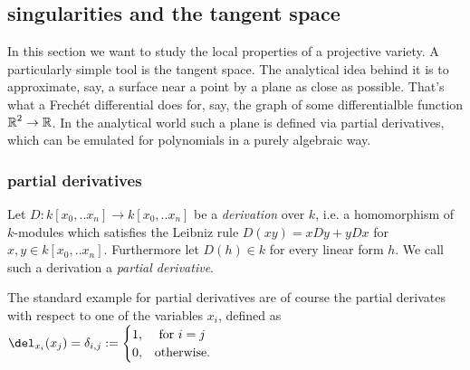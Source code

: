 \subsection{singularities and the tangent space}

In this section we want to study the local properties of a projective variety.
A particularly simple tool is the tangent space.
The analytical idea behind it is to approximate, say, a surface near a point by a plane as close as possible.
That's what a Frechét differential does for, say,  the graph of some differentialble function $\operatorname{\mathbb R}^2 \to \operatorname{\mathbb R}$.
In the analytical world such a plane is defined via partial derivatives, which can be emulated for polynomials in a purely algebraic way.

\subsubsection{partial derivatives}
\begin{definition}
Let $D : k[x_0,..x_n] \to k[x_0,..x_n]$ be a \emph{derivation} over $k$, i.e. a homomorphism of $k$-modules which satisfies the Leibniz rule $D(xy) = xDy+yDx$ for $x,y \in k[x_0,..x_n]$. Furthermore let $D(h) \in k$ for every linear form $h$. We call such a derivation a \emph{partial derivative}.
\end{definition}

\begin{example}
The standard example for partial derivatives are of course the partial derivates with respect to one of the variables $x_i$, defined as $\del_{x_i}(x_j) = \delta_{i,j} := \begin{cases} 1, & \text{ for } i = j \\ 0, & \text {otherwise.} \end{cases}$
\end{example}

